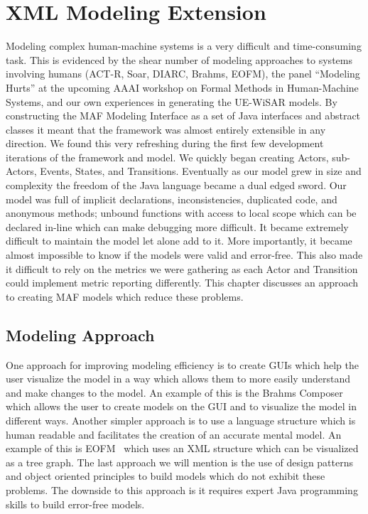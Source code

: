 \chapter{XML Modeling Extension} \label{ch:xmlparser}

Modeling complex human-machine systems is a very difficult and time-consuming task.  This is evidenced by the shear number of modeling approaches to systems involving humans (ACT-R, Soar, DIARC, Brahms, EOFM), the panel ``Modeling Hurts'' at the upcoming AAAI workshop on Formal Methods in Human-Machine Systems, and our own experiences in generating the UE-WiSAR models.  By constructing the MAF Modeling Interface as a set of Java interfaces and abstract classes it meant that the framework was almost entirely extensible in any direction.  We found this very refreshing during the first few development iterations of the framework and model.  We quickly began creating Actors, sub-Actors, Events, States, and Transitions.  Eventually as our model grew in size and complexity the freedom of the Java language became a dual edged sword.  Our model was full of implicit declarations, inconsistencies, duplicated code, and anonymous methods; unbound functions with access to local scope which can be declared in-line which can make debugging more difficult.  It became extremely difficult to maintain the model let alone add to it.  More importantly, it became almost impossible to know if the models were valid and error-free.  This also made it difficult to rely on the metrics we were gathering as each Actor and Transition could implement metric reporting differently.  This chapter discusses an approach to creating MAF models which reduce these problems.

\section{Modeling Approach}

One approach for improving modeling efficiency is to create GUIs which help the user visualize the model in a way which allows them to more easily understand and make changes to the model.  An example of this is the Brahms Composer~\cite{seah2005multi} which allows the user to create models on the GUI and to visualize the model in different ways.  Another simpler approach is to use a language structure which is human readable and facilitates the creation of an accurate mental model.  An example of this is EOFM~\cite{bolton2009enhanced} which uses an XML structure which can be visualized as a tree graph.  The last approach we will mention is the use of design patterns and object oriented principles to build models which do not exhibit these problems.  The downside to this approach is it requires expert Java programming skills to build error-free models.

